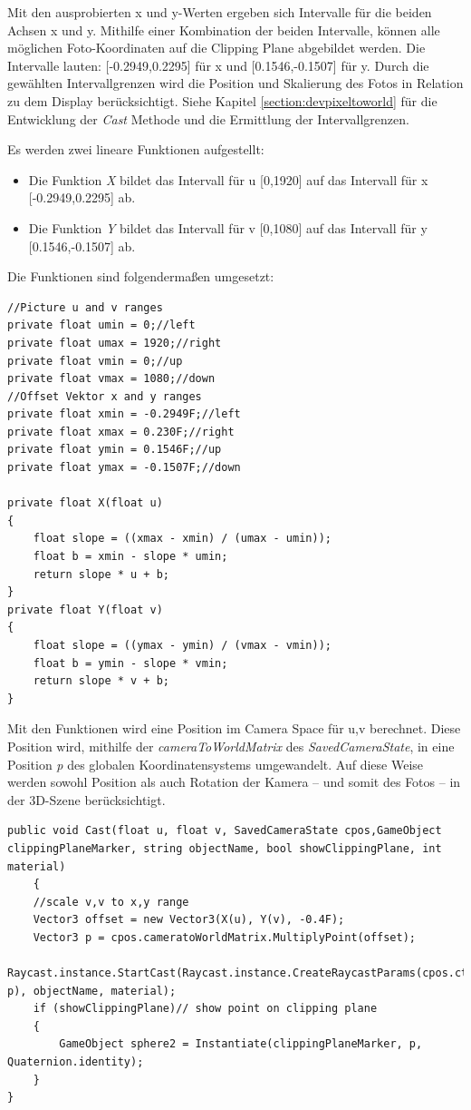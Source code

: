 Mit den ausprobierten x und y-Werten ergeben sich Intervalle für die beiden Achsen x und y. Mithilfe einer  Kombination der beiden Intervalle, können alle möglichen Foto-Koordinaten auf die Clipping Plane abgebildet werden. Die Intervalle lauten: [-0.2949,0.2295] für x und [0.1546,-0.1507] für y. Durch die gewählten Intervallgrenzen wird die Position und Skalierung des Fotos in Relation zu dem Display berücksichtigt. Siehe Kapitel \ref{section:devpixeltoworld} für die Entwicklung der \textit{Cast} Methode und die Ermittlung der Intervallgrenzen.

Es werden zwei lineare Funktionen aufgestellt:
\begin{itemize}
	\item Die Funktion \textit{X} bildet das Intervall für u [0,1920] auf das Intervall für x [-0.2949,0.2295] ab.
	\item Die Funktion \textit{Y} bildet das Intervall für v [0,1080] auf das Intervall für y [0.1546,-0.1507] ab.
\end{itemize}

Die Funktionen sind folgendermaßen umgesetzt:

\begin{lstlisting}
//Picture u and v ranges
private float umin = 0;//left
private float umax = 1920;//right
private float vmin = 0;//up
private float vmax = 1080;//down
//Offset Vektor x and y ranges
private float xmin = -0.2949F;//left
private float xmax = 0.230F;//right
private float ymin = 0.1546F;//up
private float ymax = -0.1507F;//down

private float X(float u)
{
	float slope = ((xmax - xmin) / (umax - umin));
	float b = xmin - slope * umin;
	return slope * u + b;
}
private float Y(float v)
{
	float slope = ((ymax - ymin) / (vmax - vmin));
	float b = ymin - slope * vmin;
	return slope * v + b;
}
\end{lstlisting}

Mit den Funktionen wird eine Position im Camera Space für u,v berechnet. Diese Position wird, mithilfe der \textit{cameraToWorldMatrix} des \textit{SavedCameraState}, in eine Position \textit{p} des globalen Koordinatensystems umgewandelt. Auf diese Weise werden sowohl Position als auch Rotation der Kamera – und somit des Fotos – in der 3D-Szene berücksichtigt. %

\begin{lstlisting}
public void Cast(float u, float v, SavedCameraState cpos,GameObject clippingPlaneMarker, string objectName, bool showClippingPlane, int material)
	{
	//scale v,v to x,y range
	Vector3 offset = new Vector3(X(u), Y(v), -0.4F);
	Vector3 p = cpos.cameratoWorldMatrix.MultiplyPoint(offset);
	Raycast.instance.StartCast(Raycast.instance.CreateRaycastParams(cpos.ctransform, p), objectName, material);
	if (showClippingPlane)// show point on clipping plane
	{
		GameObject sphere2 = Instantiate(clippingPlaneMarker, p, Quaternion.identity);
	}
}
\end{lstlisting}

